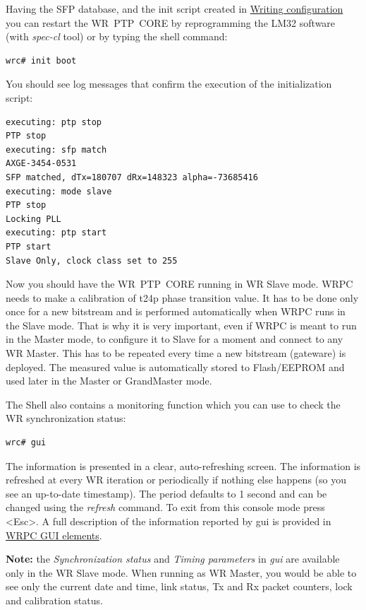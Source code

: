 \documentclass[a4paper, 12pt]{article}
\newcommand{\link}[1]{\hyperref[#1]{#1}}
\newcommand{\codeHook}[1]{\mbox{\ttfamily\MakeTextUppercase{#1}}}
\begin{document}
Having the \codeHook{sfp} database, and the init script created in \link{Writing
configuration} you can restart the \codeHook{wr ptp core} by reprogramming the
\codeHook{lm32} software (with \textit{spec-cl} tool) or by typing the shell command:

\begin{lstlisting}
wrc# init boot
\end{lstlisting}

You should see log messages that confirm the execution of the initialization
script:

\begin{lstlisting}
executing: ptp stop
PTP stop
executing: sfp match
AXGE-3454-0531
SFP matched, dTx=180707 dRx=148323 alpha=-73685416
executing: mode slave
PTP stop
Locking PLL
executing: ptp start
PTP start
Slave Only, clock class set to 255
\end{lstlisting}

Now you should have the \codeHook{wr ptp core} running in \codeHook{wr} Slave mode.
\codeHook{wrpc} needs to make a calibration of t24p phase transition value. It has to
be done only once for a new bitstream and is performed automatically when
\codeHook{wrpc} runs in the Slave mode. That is why it is very important, even if
\codeHook{wrpc} is meant to run in the Master mode, to configure it to Slave for a
moment and connect to any \codeHook{wr} Master. This has to be repeated every time
a new bitstream (gateware) is deployed. The measured value is automatically
stored to Flash/EEPROM and used later in the Master or GrandMaster mode.

The Shell also contains a monitoring function which you can use to check the
\codeHook{wr} synchronization status:

\begin{lstlisting}
wrc# gui
\end{lstlisting}

The information is presented in a clear, auto-refreshing screen. The
information is refreshed at every WR iteration or periodically if
nothing else happens (so you see an up-to-date timestamp). The period
defaults to 1 second and can be changed using the \textit{refresh} command. To exit from
this console mode press <Esc>. A full description of the information reported
by gui is provided in \link{WRPC GUI elements}.

\textbf{Note:} the \textit{Synchronization status} and \textit{Timing parameters} in \textit{gui}
are available only in the \codeHook{wr} Slave mode. When running as \codeHook{wr} Master, you
would be able to see only the current date and time, link status, Tx and Rx
packet counters, lock and calibration status.
\end{document}
